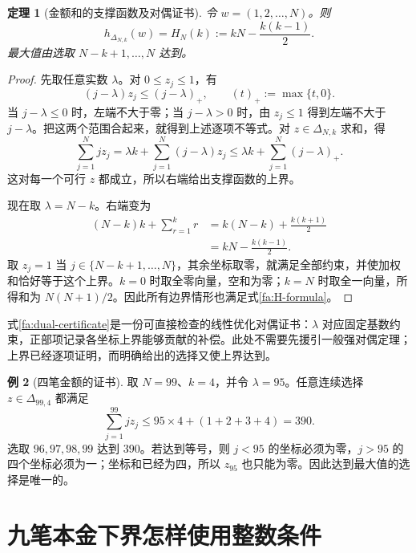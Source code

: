 \documentclass[UTF8,a4paper]{ctexbook}
\newtheorem{theorem}{定理}[chapter]
\theoremstyle{definition}
\newtheorem{example}[theorem]{例}
\numberwithin{equation}{chapter}
\newcommand{\1}{\mathbf{1}}
\begin{document}
\begin{theorem}[金额和的支撑函数及对偶证书]\label{fa:support-formula}
令 $w=(1,2,\ldots,N)$。则
\begin{equation}\label{fa:H-formula}
h_{\Delta_{N,k}}(w)
=H_N(k):=kN-\frac{k(k-1)}2.
\end{equation}
最大值由选取 $N-k+1,\ldots,N$ 达到。
\end{theorem}

\begin{proof}
先取任意实数 $\lambda$。对 $0\le z_j\le1$，有
\[
(j-\lambda)z_j\le(j-\lambda)_+,
\qquad(t)_+:=\max\{t,0\}.
\]
当 $j-\lambda\le0$ 时，左端不大于零；当 $j-\lambda>0$ 时，由 $z_j\le1$ 得到左端不大于 $j-\lambda$。把这两个范围合起来，就得到上述逐项不等式。对 $z\in\Delta_{N,k}$ 求和，得
\begin{equation}\label{fa:dual-certificate}
\sum_{j=1}^N jz_j
=\lambda k+\sum_{j=1}^N(j-\lambda)z_j
\le\lambda k+\sum_{j=1}^N(j-\lambda)_+.
\end{equation}
这对每一个可行 $z$ 都成立，所以右端给出支撑函数的上界。

现在取 $\lambda=N-k$。右端变为
\begin{align*}
(N-k)k+\sum_{r=1}^k r
&=k(N-k)+\frac{k(k+1)}2\\
&=kN-\frac{k(k-1)}2.
\end{align*}
取 $z_j=1$ 当 $j\in\{N-k+1,\ldots,N\}$，其余坐标取零，就满足全部约束，并使加权和恰好等于这个上界。$k=0$ 时取全零向量，空和为零；$k=N$ 时取全一向量，所得和为 $N(N+1)/2$。因此所有边界情形也满足式\eqref{fa:H-formula}。
\end{proof}

式\eqref{fa:dual-certificate}是一份可直接检查的线性优化对偶证书：$\lambda$ 对应固定基数约束，正部项记录各坐标上界能够贡献的补偿。此处不需要先援引一般强对偶定理；上界已经逐项证明，而明确给出的选择又使上界达到。

\begin{example}[四笔金额的证书]\label{fa:four-certificate}
取 $N=99$、$k=4$，并令 $\lambda=95$。任意连续选择 $z\in\Delta_{99,4}$ 都满足
\[
\sum_{j=1}^{99}jz_j
\le95\times4+(1+2+3+4)=390.
\]
选取 $96,97,98,99$ 达到 $390$。若达到等号，则 $j<95$ 的坐标必须为零，$j>95$ 的四个坐标必须为一；坐标和已经为四，所以 $z_{95}$ 也只能为零。因此达到最大值的选择是唯一的。
\end{example}

\section{九笔本金下界怎样使用整数条件}
\end{document}
